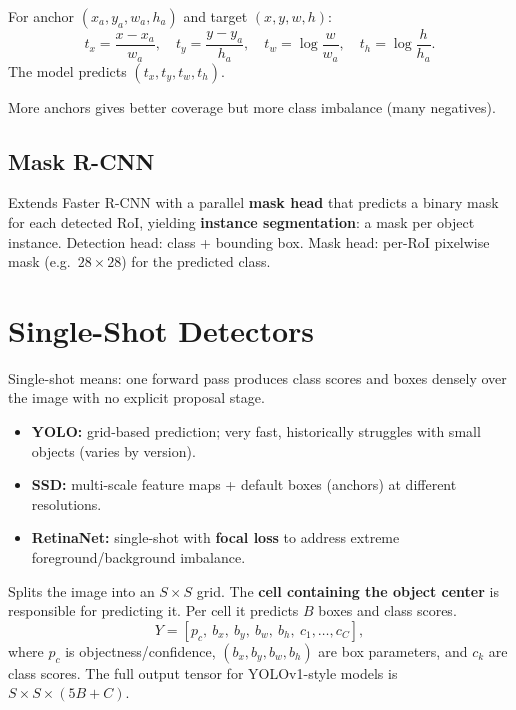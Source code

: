 \documentclass[11pt, oneside]{book}
\begin{document}
\begin{thmbox}[title={Anchor Offset Parameterization}]
For anchor $(x_a,y_a,w_a,h_a)$ and target $(x,y,w,h)$:
\[
t_x=\frac{x-x_a}{w_a},\quad t_y=\frac{y-y_a}{h_a},\quad
t_w=\log\frac{w}{w_a},\quad t_h=\log\frac{h}{h_a}.
\]
The model predicts $(t_x,t_y,t_w,t_h)$.
\end{thmbox}

More anchors gives better coverage but more class imbalance (many negatives).

\subsection{Mask R-CNN}

\begin{defbox}[title={Mask R-CNN}]
Extends Faster R-CNN with a parallel \textbf{mask head} that predicts a binary mask for each detected RoI,
yielding \textbf{instance segmentation}: a mask per object instance.
Detection head: class + bounding box. Mask head: per-RoI pixelwise mask (e.g.\ $28\times 28$) for the predicted class.
\end{defbox}

\section{Single-Shot Detectors}

Single-shot means: one forward pass produces class scores and boxes densely over the image with no explicit proposal stage.

\begin{itemize}
  \item \textbf{YOLO:} grid-based prediction; very fast, historically struggles with small objects (varies by version).
  \item \textbf{SSD:} multi-scale feature maps + default boxes (anchors) at different resolutions.
  \item \textbf{RetinaNet:} single-shot with \textbf{focal loss} to address extreme foreground/background imbalance.
\end{itemize}

\begin{defbox}[title={YOLO}]
Splits the image into an $S\times S$ grid. The \textbf{cell containing the object center} is responsible for predicting it.
Per cell it predicts $B$ boxes and class scores.
\[
Y = [p_c,\ b_x,\ b_y,\ b_w,\ b_h,\ c_1,\dots,c_C],
\]
where $p_c$ is objectness/confidence, $(b_x,b_y,b_w,b_h)$ are box parameters, and $c_k$ are class scores.
The full output tensor for YOLOv1-style models is $S\times S\times (5B + C)$.
\end{defbox}
\end{document}
